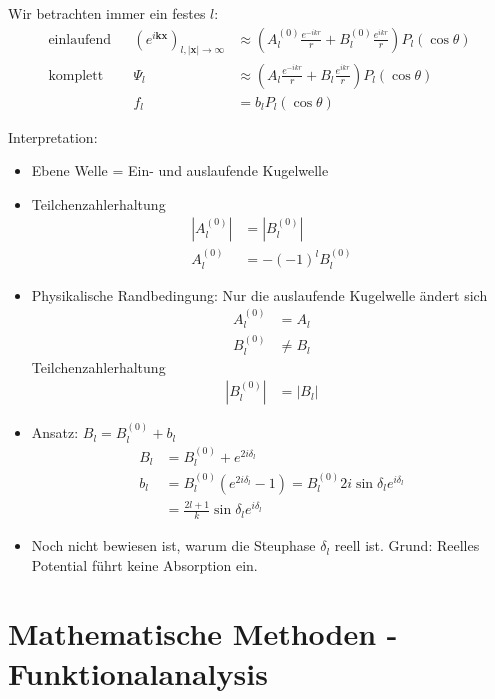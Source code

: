 \documentclass[11pt,a4paper]{report}
\begin{document}
Wir betrachten immer ein festes $l$:
\begin{align*}
    \text{einlaufend} && (e^{i \mathbf{k} \mathbf{x}})_{l, |\mathbf{x}| \rightarrow \infty} &\approx \left(A_l^{(0)} \frac{e^{- i k r}}{r} + B_l^{(0)} \frac{e^{i k r}}{r}\right) P_l(\cos \theta) \\
    \text{komplett} && \Psi_l &\approx \left( A_l \frac{e^{-i k r}}{r} + B_l \frac{e^{i k r}}{r}\right) P_l(\cos \theta) \\
    && f_l &= b_l P_l(\cos \theta)
\end{align*}

Interpretation:
\begin{itemize}
    \item Ebene Welle = Ein- und auslaufende Kugelwelle
    \item Teilchenzahlerhaltung
    \begin{align*}
        |A_l^{(0)}| &= |B_l^{(0)}| \\
        A_l^{(0)} &= -(-1)^l B_l^{(0)}
    \end{align*}
    \item Physikalische Randbedingung: Nur die auslaufende Kugelwelle ändert sich
    \begin{align*}
        A_l^{(0)} &= A_l \\
        B_l^{(0)} &\neq B_l
    \end{align*}
    Teilchenzahlerhaltung
    \begin{align*}
        |B_l^{(0)}| &= |B_l|
    \end{align*}
    \item Ansatz: $B_l = B_l^{(0)} + b_l$
    \begin{align*}
        B_l &= B_l^{(0)} + e^{2 i \delta_l} \\
        b_l &= B_l^{(0)} (e^{2 i \delta_l} - 1) = B_l^{(0)} 2 i \sin \delta_l e^{i \delta_l} \\
        &= \frac{2 l + 1}{k} \sin \delta_l e^{i \delta_l}
    \end{align*}
    \item Noch nicht bewiesen ist, warum die Steuphase $\delta_l$ reell ist. Grund: Reelles Potential führt keine Absorption ein.
\end{itemize}

\section{Mathematische Methoden - Funktionalanalysis}
\end{document}

